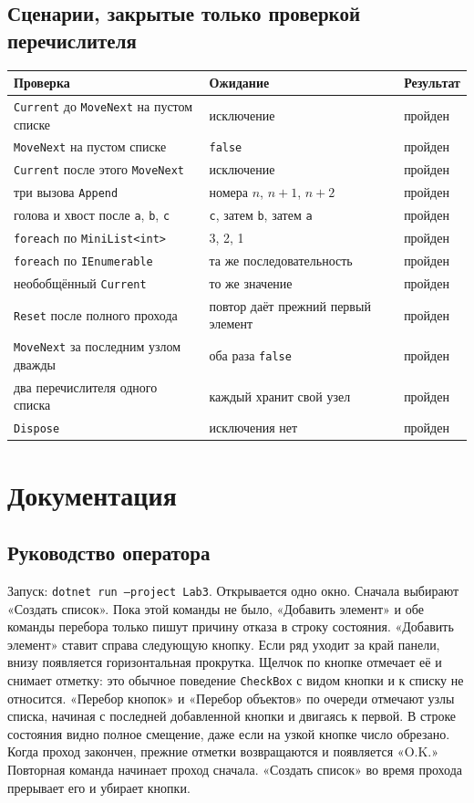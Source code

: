 \documentclass[a4paper,14pt]{extarticle}
\begin{document}
\subsection{Сценарии, закрытые только проверкой перечислителя}
\begin{center}
\begin{tabular}{p{}p{}p{}}
\toprule
Проверка & Ожидание & Результат\\
\midrule
\texttt{Current} до \texttt{MoveNext} на пустом списке & исключение & пройден\\
\texttt{MoveNext} на пустом списке & \texttt{false} & пройден\\
\texttt{Current} после этого \texttt{MoveNext} & исключение & пройден\\
три вызова \texttt{Append} & номера \(n\), \(n+1\), \(n+2\) & пройден\\
голова и хвост после \texttt{a}, \texttt{b}, \texttt{c} & \texttt{c}, затем \texttt{b}, затем \texttt{a} & пройден\\
\texttt{foreach} по \texttt{MiniList<int>} & 3, 2, 1 & пройден\\
\texttt{foreach} по \texttt{IEnumerable} & та же последовательность & пройден\\
необобщённый \texttt{Current} & то же значение & пройден\\
\texttt{Reset} после полного прохода & повтор даёт прежний первый элемент & пройден\\
\texttt{MoveNext} за последним узлом дважды & оба раза \texttt{false} & пройден\\
два перечислителя одного списка & каждый хранит свой узел & пройден\\
\texttt{Dispose} & исключения нет & пройден\\
\bottomrule
\end{tabular}
\end{center}
\section{Документация}
\subsection{Руководство оператора}
Запуск: \texttt{dotnet run --project Lab3}. Открывается одно окно.
Сначала выбирают «Создать список». Пока этой команды не было, «Добавить элемент» и обе команды перебора только пишут причину отказа в строку состояния.
«Добавить элемент» ставит справа следующую кнопку. Если ряд уходит за край панели, внизу появляется горизонтальная прокрутка. Щелчок по кнопке отмечает её и снимает отметку: это обычное поведение \texttt{CheckBox} с видом кнопки и к списку не относится.
«Перебор кнопок» и «Перебор объектов» по очереди отмечают узлы списка, начиная с последней добавленной кнопки и двигаясь к первой. В строке состояния видно полное смещение, даже если на узкой кнопке число обрезано. Когда проход закончен, прежние отметки возвращаются и появляется «O.K.» Повторная команда начинает проход сначала. «Создать список» во время прохода прерывает его и убирает кнопки.
\end{document}
